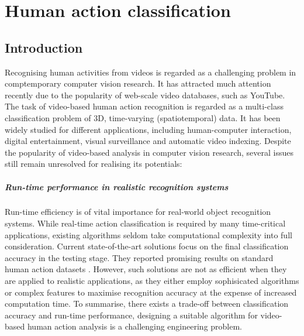 \chapter{Human action classification}
\label{chap/act}

\section{Introduction}
\label{sec/act/intro}

Recognising human activities from videos is regarded as a challenging problem in comptemporary computer vision research. 
It has attracted much attention recently due to the popularity of web-scale video databases, such as YouTube. 
The task of video-based human action recognition is regarded as a multi-class classification problem of 3D, time-varying (spatiotemporal) data. 
It has been widely studied for different applications, including human-computer interaction, digital entertainment, visual surveillance and automatic video indexing.  
Despite the popularity of video-based analysis in computer vision research, several issues still remain unresolved for realising its potentials: 

\paragraph{Run-time performance in realistic recognition systems} Run-time efficiency is of vital importance for real-world object recognition systems. 
While real-time action classification is required by many time-critical applications, existing algorithms seldom take computational complexity into full consideration. Current state-of-the-art solutions focus on the final classification accuracy in the testing stage. They reported promising results on standard human action datasets \cite{Kim2007, Lin2009, Liu2008, Willems2009}. However, such solutions are not as efficient when they are applied to realistic applications, as they either employ sophisicated algorithms or complex features to maximise recognition accuracy at the expense of increased computation time. To summarise, there exists a trade-off between classification accuracy and run-time performance, designing a suitable algorithm for video-based human action analysis is a challenging engineering problem.  


